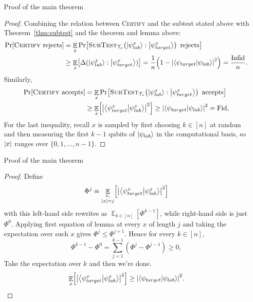 \begin{frame}{Proof of the main theorem}
    \renewcommand{\qedsymbol}{}
    \begin{proof}
    Combining the relation between \textsc{Certify} and the subtest stated above with Theorem~\ref{thm:subtest} and the theorem and lemma above:
        \begin{align*}
            \Pr[\textsc{Certify}\text{ rejects}]
                &= \mathop{\mathbb{E}}_{x}\Pr\!\left[\textsc{SubTest}_{\mathcal{T}_x}\!\left(\ket{\psi_{lab}^x}:\ket{\psi_{target}^x}\right)\text{ rejects}\right]\\
                &\geq \mathop{\mathbb{E}}_{x}\!\left[\Delta(\ket{\psi_{lab}^x}:\ket{\psi_{target}^x})\right]
                = \frac{1}{n}\!\left(1 - \abs{\braket{\psi_{target}}{\psi_{lab}}}^2\right) = \frac{\mathrm{Infid}}{n}.
        \end{align*}
    Similarly,
        \begin{align*}
            \Pr[\textsc{Certify}\text{ accepts}]
                &= \mathop{\mathbb{E}}_{x}\Pr\!\left[\textsc{SubTest}_{\mathcal{T}_x}\!\left(\ket{\psi_{lab}^x}:\ket{\psi_{target}^x}\right)\text{ accepts}\right]\\
                &\geq \mathop{\mathbb{E}}_{x}\!\left[\abs{\braket{\psi_{target}^x}{\psi_{lab}^x}}^2\right]
                \geq \abs{\braket{\psi_{target}}{\psi_{lab}}}^2 = \mathrm{Fid},
        \end{align*}
        For the last inequality, recall $x$ is sampled by first choosing $k\in[n]$ at random and then measuring the first $k-1$ qubits of $\ket{\psi_{lab}}$ in the computational basis, 
        so $\abs{x}$ ranges over $\{0, 1, \ldots, n-1\}$. 
    \end{proof}
\end{frame}

\begin{frame}{Proof of the main theorem}
    \begin{proof}
        Define
        \[
            \Phi^j \equiv \mathop{\mathbb{E}}_{\substack{x,\\\abs{x}=j}}\!\left[\abs{\braket{\psi_{target}^{x}}{\psi_{lab}^{x}}}^2\right]
        \]
        with this  left-hand side rewrites as $\mathop{\mathbb{E}}_{k\in[n]}\!\left[\Phi^{k-1}\right]$, 
        while right-hand side is just $\Phi^0$. 
        Applying first equation of lemma at every $x$ of length $j$ 
        and taking the expectation over such $x$ gives $\Phi^j \leq \Phi^{j+1}$. Hence for every $k\in[n]$,
        \[
            \Phi^{k-1} - \Phi^0 = \sum_{j=1}^{k-1}\!\left(\Phi^j - \Phi^{j-1}\right) \geq 0,
        \]
        Take the expectation over $k$ and then we're done.
        \[
            \mathop{\mathbb{E}}_{x} \!\left[\abs{\braket{\psi_{target}^x}{\psi_{lab}^x}}^2\right] \geq \abs{\braket{\psi_{target}}{\psi_{lab}}}^2. 
        \]
    \end{proof}
\end{frame}

